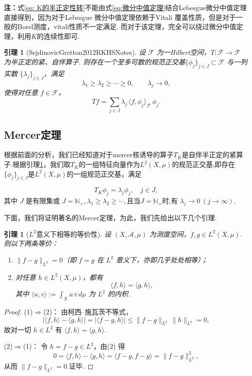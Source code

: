 \documentclass[12pt, a4paper, oneside]{ctexbook}
\newtheorem{lemma}[theorem]{引理}
\begin{document}
\textbf{注：}式\eqref{eq: K的半正定性转}不能由式\eqref{eq:微分中值定理}结合Lebesgue微分中值定理直接得到，因为对于Lebesgue 微分中值定理依赖于Vitali 覆盖性质，但是对于一般的Borel测度，vitali性质不一定满足. 而对于该定理，完全可以绕过微分中值定理，利用$K$的连续性即可.

\begin{lemma}[SejdinovicGretton2012RKHSNotes]\label{lemma:Sejdinovic}
设 $\mathcal{F}$ 为一Hilbert空间，$T:\mathcal{F}\to\mathcal{F}$ 为半正定的紧、自伴算子.
则存在一个至多可数的规范正交基$\{\phi_j\}_{j\in J}\subset\mathcal{F}$ 与一列实数
$\{\lambda_j\}_{j\in J}$，满足
\[
\lambda_1\ge \lambda_2\ge \cdots \geq  0,\qquad \lambda_j\to 0,
\]
使得对任意 $f\in\mathcal{F}$，
\[
Tf=\sum_{j\in J}\lambda_j\,\langle f,\phi_j\rangle_{\mathcal{F}}\,\phi_j .
\]
\end{lemma}


\subsection{Mercer定理}
根据前面的分析，我们已经知道对于mercer核诱导的算子$T_K$是自伴半正定的紧算子.根据引理\ref{lemma:Sejdinovic}，我们取$T_K$的一组特征向量作为$L^2(X,\mu)$的规范正交基,即存在$\{\phi_j\}_{j\in J}$是$L^2(X,\mu)$的一组规范正交基，满足

$$T_K\phi_j=\lambda_j\phi_j,\quad j\in J,$$
其中 $J$ 是有限集或 $J=\mathbb{N}_+,\lambda_1\geq\lambda_2\geq\cdots,$且当$J=\mathbb{N}_+$时,有 $\lambda_j\to0~(j\to\infty).$

下面，我们将证明著名的Mercer定理，为此，我们先给出以下几个引理.
\begin{lemma}[$L^2$意义下相等的等价性]\label{lemma: L2中等价性}
    设 $(X,\mathcal{A},\mu)$ 为测度空间，$f,g\in L^2(X,\mu)$.则以下两条等价：
\begin{enumerate}
    \item $\|f-g\|_{L^2}=0$（即 $f=g$ 在 $L^2$ 意义下，亦即几乎处处相等）；
    \item 对任意 $h\in L^2(X,\mu)$，都有
    \[
        \langle f,h\rangle=\langle g,h\rangle,
    \]
    其中 $\langle u,v\rangle:=\int_X u\,\overline{v}\,d\mu$ 为 $L^2$ 的内积.
\end{enumerate}

\end{lemma}
\begin{proof}
(1)$\Rightarrow$(2)：
由柯西–施瓦茨不等式，
\[
\big|\langle f,h\rangle-\langle g,h\rangle\big|
=\big|\langle f-g,h\rangle\big|
\le \|f-g\|_{L^2}\,\|h\|_{L^2}=0,
\]
故对一切 $h\in L^2$ 有 $\langle f,h\rangle=\langle g,h\rangle$.

(2)$\Rightarrow$(1)：
令 $h=f-g\in L^2$，由(2) 得
\[
0=\langle f,h\rangle-\langle g,h\rangle
=\langle f-g,f-g\rangle
=\|f-g\|_{L^2}^2,
\]
从而 $\|f-g\|_{L^2}=0$.证毕.
\end{proof}
\end{document}
